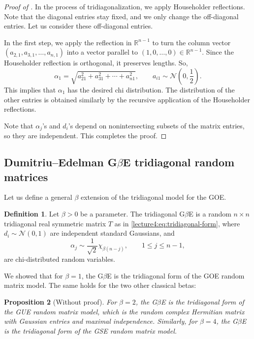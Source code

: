 \documentclass[letterpaper,11pt,oneside,reqno]{book}
\numberwithin{equation}{chapter}  %
\newtheorem{proposition}{Proposition}[chapter]  %
\theoremstyle{definition}
\newtheorem{definition}[proposition]{Definition}
\begin{document}
\begin{proof}[Proof of ]
	In the process of tridiagonalization,
	we apply Householder reflections.
	Note that the diagonal entries stay fixed,
	and we only change the off-diagonal entries.
	Let us consider these off-diagonal entries.

	In the first step, we apply the reflection in $\mathbb{R}^{n-1}$
	to turn the column vector $(a_{2,1},a_{3,1},\ldots,a_{n,1} )$ into
	a vector parallel to $(1,0,\ldots,0)\in \mathbb{R}^{n-1}$.
	Since the Householder reflection is orthogonal,
	it preserves lengths. So,
	\begin{equation*}
		\alpha_1=\sqrt{a_{21}^2+a_{31}^2+\cdots+a_{n1}^2},\qquad a_{i1}\sim
		\mathcal{N}(0,\dfrac{1}{2}).
	\end{equation*}
	This implies that $\alpha_1$ has the desired chi distribution.
	The distribution of the other entries is obtained similarly by the recursive
	application of the Householder reflections.

	Note that $\alpha_j$'s and $d_i$'s depend on nonintersecting
	subsets of the matrix entries, so they are independent. This completes the proof.
\end{proof}



\subsection{Dumitriu--Edelman G$\beta$E tridiagonal random matrices}

Let us define a general $\beta$ extension of the tridiagonal model for the
GOE.

\begin{definition}
	\label{lecture4:def:tridiagonal-model-general-beta}
	Let $\beta>0$ be a parameter.
	The tridiagonal G$\beta$E is a random $n\times n$
	tridiagonal real symmetric
	matrix $T$ as in
	\eqref{lecture4:eq:tridiagonal-form},
	where $d_i\sim \mathcal{N}(0,1)$ are independent standard Gaussians,
	and
	\begin{equation*}
		\alpha_j\sim \frac{1}{\sqrt 2}\chi_{\beta(n-j)},\qquad
		1\le j\le n-1,
	\end{equation*}
	are chi-distributed random variables.
\end{definition}

We showed that for $\beta=1$,
the G$\beta$E is the tridiagonal form of the GOE random matrix model.
The same holds for the two other classical betas:
\begin{proposition}[Without proof]
	\label{lecture4:prop:tridiagonal-model-beta-classical}
	For $\beta=2$, the G$\beta$E is the tridiagonal form of the GUE random matrix model,
	which is the random complex Hermitian matrix with Gaussian entries and maximal
	independence. Similarly, for $\beta=4$,
	the G$\beta$E is the tridiagonal form of the GSE random matrix model.
\end{proposition}
\end{document}
